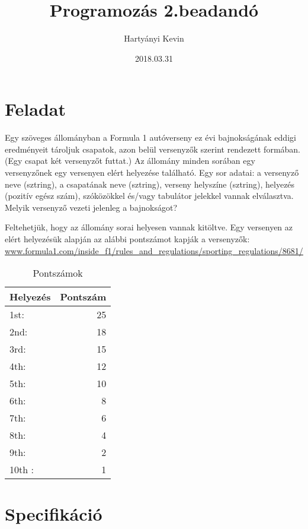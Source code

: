 \documentclass[a4paper]{article}
\title {Programozás 2.beadandó}
\date {2018.03.31}
\author {Hartyányi Kevin}
\begin{document}
	
	\maketitle
	\tableofcontents
	\listoftables
	\newpage
	
	\section{Feladat}
	
	Egy szöveges állományban a Formula 1 autóverseny ez évi bajnokságának eddigi
	eredményeit tároljuk csapatok, azon belül versenyzők szerint rendezett formában. (Egy
	csapat két versenyzőt futtat.) Az állomány minden sorában egy versenyzőnek egy
	versenyen elért helyezése található. Egy sor adatai: a versenyző neve (sztring), a
	csapatának neve (sztring), verseny helyszíne (sztring), helyezés (pozitív egész szám),
	szóközökkel és/vagy tabulátor jelekkel vannak elválasztva. Melyik versenyző vezeti
	jelenleg a bajnokságot?
	
	Feltehetjük, hogy az állomány sorai helyesen vannak kitöltve. Egy versenyen az elért
	helyezésük alapján az alábbi pontszámot kapják a versenyzők:
	\url{www.formula1.com/inside_f1/rules_and_regulations/sporting_regulations/8681/}
	\begin{table}[h!]
		\begin{center}
			\caption{Pontszámok}
			\label{tab:pontszamok}
			\begin{tabular}{l|r}
				\textbf{Helyezés} & \textbf{Pontszám} \\
				\hline
				1st: & 25\\
				2nd: &18 \\
				3rd:& 15\\
				4th: &12 \\
				5th: &10 \\
				6th: &8 \\
				7th: &6 \\
				8th:& 4 \\
				9th: &2 \\
				10th :& 1 \\				
			\end{tabular}
		\end{center}
	\end{table}	

	\section{Specifikáció}	
		
\end{document}
